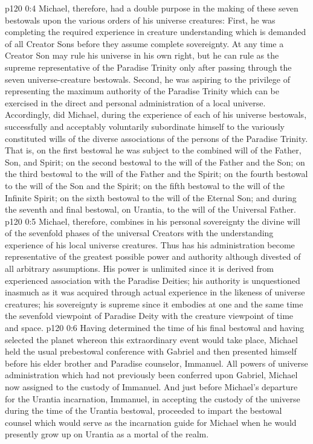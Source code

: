 \vs p120 0:4 Michael, therefore, had a double purpose in the making of these seven bestowals upon the various orders of his universe creatures: First, he was completing the required experience in creature understanding which is demanded of all Creator Sons before they assume complete sovereignty. At any time a Creator Son may rule his universe in his own right, but he can rule as the supreme representative of the Paradise Trinity only after passing through the seven universe\hyp{}creature bestowals. Second, he was aspiring to the privilege of representing the maximum authority of the Paradise Trinity which can be exercised in the direct and personal administration of a local universe. Accordingly, did Michael, during the experience of each of his universe bestowals, successfully and acceptably voluntarily subordinate himself to the variously constituted wills of the diverse associations of the persons of the Paradise Trinity. That is, on the first bestowal he was subject to the combined will of the Father, Son, and Spirit; on the second bestowal to the will of the Father and the Son; on the third bestowal to the will of the Father and the Spirit; on the fourth bestowal to the will of the Son and the Spirit; on the fifth bestowal to the will of the Infinite Spirit; on the sixth bestowal to the will of the Eternal Son; and during the seventh and final bestowal, on Urantia, to the will of the Universal Father.
\vs p120 0:5 Michael, therefore, combines in his personal sovereignty the divine will of the sevenfold phases of the universal Creators with the understanding experience of his local universe creatures. Thus has his administration become representative of the greatest possible power and authority although divested of all arbitrary assumptions. His power is unlimited since it is derived from experienced association with the Paradise Deities; his authority is unquestioned inasmuch as it was acquired through actual experience in the likeness of universe creatures; his sovereignty is supreme since it embodies at one and the same time the sevenfold viewpoint of Paradise Deity with the creature viewpoint of time and space.
\pc \vs p120 0:6 Having determined the time of his final bestowal and having selected the planet whereon this extraordinary event would take place, Michael held the usual prebestowal conference with Gabriel and then presented himself before his elder brother and Paradise counselor, Immanuel. All powers of universe administration which had not previously been conferred upon Gabriel, Michael now assigned to the custody of Immanuel. And just before Michael’s departure for the Urantia incarnation, Immanuel, in accepting the custody of the universe during the time of the Urantia bestowal, proceeded to impart the bestowal counsel which would serve as the incarnation guide for Michael when he would presently grow up on Urantia as a mortal of the realm.
